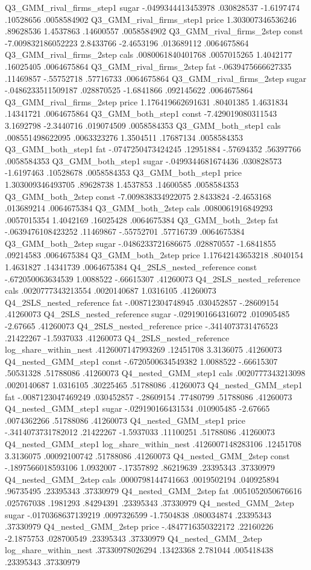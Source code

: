 Q3_GMM_rival_firms_step1	sugar	-.0499344413453978	.030828537	-1.6197474	.10528656	.0058584902	
Q3_GMM_rival_firms_step1	price	1.303007346536246	.89628536	1.4537863	.14600557	.0058584902	
Q3_GMM_rival_firms_2step	const	-7.009832186052223	2.8433766	-2.4653196	.013689112	.0064675864	
Q3_GMM_rival_firms_2step	cals	.0080061840401768	.0057015265	1.4042177	.16025405	.0064675864	
Q3_GMM_rival_firms_2step	fat	-.0639475666627335	.11469857	-.55752718	.57716733	.0064675864	
Q3_GMM_rival_firms_2step	sugar	-.0486233511509187	.028870525	-1.6841866	.092145622	.0064675864	
Q3_GMM_rival_firms_2step	price	1.176419662691631	.80401385	1.4631834	.14341721	.0064675864	
Q3_GMM_both_step1	const	-7.429019080311543	3.1692798	-2.3440716	.019074509	.0058584353	
Q3_GMM_both_step1	cals	.008551498622095	.0063323276	1.3504511	.17687134	.0058584353	
Q3_GMM_both_step1	fat	-.0747250473424245	.12951884	-.57694352	.56397766	.0058584353	
Q3_GMM_both_step1	sugar	-.0499344681674436	.030828573	-1.6197463	.10528678	.0058584353	
Q3_GMM_both_step1	price	1.303009346493705	.89628738	1.4537853	.14600585	.0058584353	
Q3_GMM_both_2step	const	-7.009838334922075	2.8433824	-2.4653168	.013689214	.0064675384	
Q3_GMM_both_2step	cals	.0080061916849293	.0057015354	1.4042169	.16025428	.0064675384	
Q3_GMM_both_2step	fat	-.0639476108423252	.11469867	-.55752701	.57716739	.0064675384	
Q3_GMM_both_2step	sugar	-.0486233721686675	.028870557	-1.6841855	.09214583	.0064675384	
Q3_GMM_both_2step	price	1.17642143653218	.8040154	1.4631827	.14341739	.0064675384	
Q4_2SLS_nested_reference	const	-.672050063634539	1.0088522	-.66615307			.41260073
Q4_2SLS_nested_reference	cals	.0020777343213554	.0020140687	1.0316105			.41260073
Q4_2SLS_nested_reference	fat	-.008712304748945	.030452857	-.28609154			.41260073
Q4_2SLS_nested_reference	sugar	-.0291901664316072	.010905485	-2.67665			.41260073
Q4_2SLS_nested_reference	price	-.3414073731476523	.21422267	-1.5937033			.41260073
Q4_2SLS_nested_reference	log_share_within_nest	.4126007147993269	.12451708	3.3136075			.41260073
Q4_nested_GMM_step1	const	-.6720500634549382	1.0088522	-.66615307	.50531328	.51788086	.41260073
Q4_nested_GMM_step1	cals	.0020777343213098	.0020140687	1.0316105	.30225465	.51788086	.41260073
Q4_nested_GMM_step1	fat	-.0087123047469249	.030452857	-.28609154	.77480799	.51788086	.41260073
Q4_nested_GMM_step1	sugar	-.029190166431534	.010905485	-2.67665	.0074362266	.51788086	.41260073
Q4_nested_GMM_step1	price	-.3414073731782012	.21422267	-1.5937033	.11100251	.51788086	.41260073
Q4_nested_GMM_step1	log_share_within_nest	.4126007148283106	.12451708	3.3136075	.00092100742	.51788086	.41260073
Q4_nested_GMM_2step	const	-.1897566018593106	1.0932007	-.17357892	.86219639	.23395343	.37330979
Q4_nested_GMM_2step	cals	.0000798144741663	.0019502194	.040925894	.96735495	.23395343	.37330979
Q4_nested_GMM_2step	fat	.0051052050676616	.025767038	.1981293	.84294391	.23395343	.37330979
Q4_nested_GMM_2step	sugar	-.0170368637139219	.0097326599	-1.7504838	.080034874	.23395343	.37330979
Q4_nested_GMM_2step	price	-.4847716350322172	.22160226	-2.1875753	.028700549	.23395343	.37330979
Q4_nested_GMM_2step	log_share_within_nest	.37330978026294	.13423368	2.781044	.005418438	.23395343	.37330979
